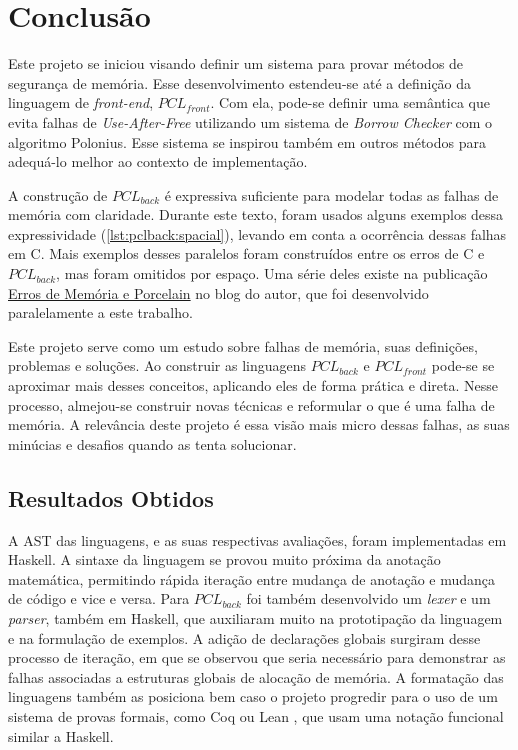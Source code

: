 \chapter{Conclusão}
\label{chap7}

Este projeto se iniciou visando definir um sistema para provar métodos de segurança de memória. Esse desenvolvimento estendeu-se até a definição da linguagem de \emph{front-end}, $PCL_{front}$. Com ela, pode-se definir uma semântica que evita falhas de \emph{Use-After-Free} utilizando um sistema de \emph{Borrow Checker} com o algoritmo Polonius. Esse sistema se inspirou também em outros métodos para adequá-lo melhor ao contexto de implementação.

A construção de $PCL_{back}$ é expressiva suficiente para modelar todas as falhas de memória com claridade. Durante este texto, foram usados alguns exemplos dessa expressividade (\ref{lst:pclback:spacial}), levando em conta a ocorrência dessas falhas em C. Mais exemplos desses paralelos foram construídos entre os erros de C e $PCL_{back}$, mas foram omitidos por espaço. Uma série deles existe na publicação \href{https://sacolle.github.io/blog/posts/porcelain-emulando-os-erros-de-memoria-de-c/}{Erros de Memória e Porcelain} no blog do autor, que foi desenvolvido paralelamente a este trabalho.

Este projeto serve como um estudo sobre falhas de memória, suas definições, problemas e soluções. Ao construir as linguagens $PCL_{back}$ e $PCL_{front}$ pode-se se aproximar mais desses conceitos, aplicando eles de forma prática e direta. Nesse processo, almejou-se construir novas técnicas e reformular o que é uma falha de memória. A relevância deste projeto é essa visão mais micro dessas falhas, as suas minúcias e desafios quando as tenta solucionar.

\section{Resultados Obtidos}
A AST das linguagens, e as suas respectivas avaliações, foram implementadas em Haskell. A sintaxe da linguagem se provou muito próxima da anotação matemática, permitindo rápida iteração entre mudança de anotação e mudança de código e vice e versa. Para $PCL_{back}$ foi também desenvolvido um \emph{lexer} e um \emph{parser}, também em Haskell, que auxiliaram muito na prototipação da linguagem e na formulação de exemplos. A adição de declarações globais surgiram desse processo de iteração, em que se observou que seria necessário para demonstrar as falhas associadas a estruturas globais de alocação de memória. A formatação das linguagens também as posiciona bem caso o projeto progredir para o uso de um sistema de provas formais, como Coq \cite{COQ} ou Lean \cite{LEAN4}, que usam uma notação funcional similar a Haskell.
